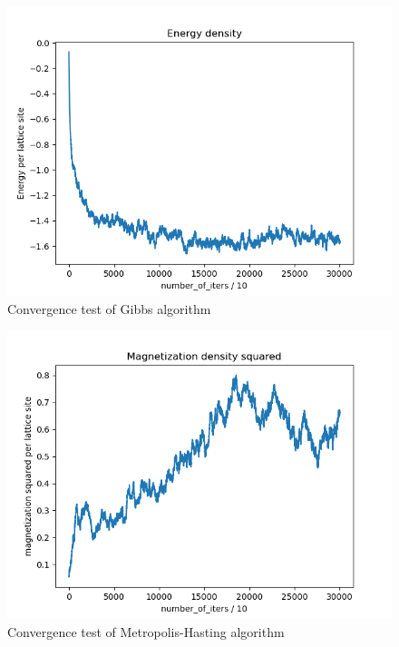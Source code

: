 \documentclass{article}
\begin{document}
    \begin{figure}[ht]
        \includegraphics[width=\columnwidth]{plots/energy_density_gibbs.png}
        \caption{Convergence test of Gibbs algorithm}
        \label{fig:3}
    \end{figure}

    \begin{figure}[ht]
        \includegraphics[width=\columnwidth]{plots/mag_sq_density_mh.png}
        \caption{Convergence test of Metropolis-Hasting algorithm}
        \label{fig:3}
    \end{figure}
\end{document}
